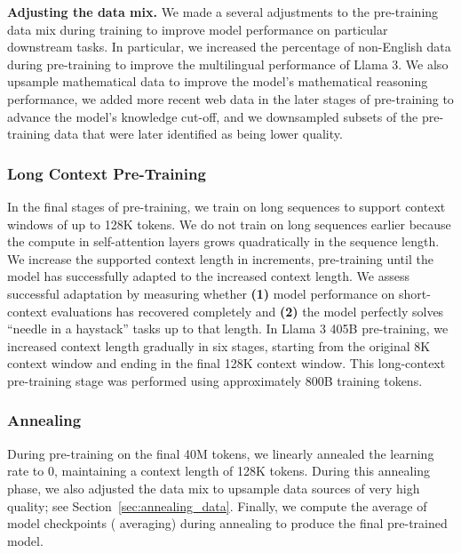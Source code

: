 \documentclass[dvipsnames]{fairmeta}
\begin{document}
\textbf{Adjusting the data mix.} 
We made a several adjustments to the pre-training data mix during training to improve model performance on particular downstream tasks. 
In particular, we increased the percentage of non-English data during pre-training to improve the multilingual performance of Llama 3.
We also upsample mathematical data to improve the model's mathematical reasoning performance, we added more recent web data in the later stages of pre-training to advance the model's knowledge cut-off, and we downsampled subsets of the pre-training data that were later identified as being lower quality.

\subsubsection{Long Context Pre-Training}
In the final stages of pre-training, we train on long sequences to support context windows of up to 128K tokens. 
We do not train on long sequences earlier because the compute in self-attention layers grows quadratically in the sequence length.
We increase the supported context length in increments, pre-training until the model has successfully adapted to the increased context length. 
We assess successful adaptation by measuring whether \textbf{(1)} model performance on short-context evaluations has recovered completely and \textbf{(2)} the model perfectly solves ``needle in a haystack'' tasks up to that length. 
In Llama 3 405B pre-training, we increased context length gradually in six stages, starting from the original 8K context window and ending in the final 128K context window.
This long-context pre-training stage was performed using approximately 800B training tokens.

\subsubsection{Annealing} 
\label{section:annealing}

During pre-training on the final 40M tokens, we linearly annealed the learning rate to 0, maintaining a context length of 128K tokens. During this annealing phase, we also adjusted the data mix to upsample data sources of very high quality; see Section~\ref{sec:annealing_data}. 
Finally, we compute the average of model checkpoints (\citet{polyak1991averaging} averaging) during annealing to produce the final pre-trained model.
\end{document}
